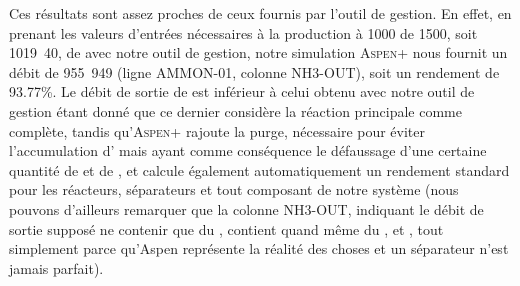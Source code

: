 Ces résultats sont assez proches de ceux fournis par
l'outil de gestion. En effet, en prenant les valeurs
d'entrées nécessaires à la production à \unit{1000}{\kelvin} de
\unit{1500}{\ton\per\dday}, soit \unit{1019.40}{\mole\per\second},
de  avec notre outil de gestion, notre simulation \textsc{Aspen+}
nous fournit un débit de \unit{955.949}{\mole\per\second} (ligne AMMON-01, colonne NH3-OUT),
soit un rendement de 93.77\%. Le débit de sortie de 
est inférieur à celui obtenu avec notre outil de gestion étant donné que
ce dernier considère la réaction principale comme complète, tandis qu'\textsc{Aspen+}
rajoute la purge, nécessaire pour éviter l'accumulation d'
mais ayant comme conséquence le défaussage d'une certaine quantité de
 et de , et calcule également automatiquement un rendement
standard pour les réacteurs, séparateurs et tout composant de notre système
(nous pouvons d'ailleurs remarquer que la colonne NH3-OUT, indiquant le débit
de sortie supposé ne contenir que du , contient quand même du 
,  et , 
tout simplement parce qu'Aspen représente la réalité des choses et 
un séparateur n'est jamais parfait).



